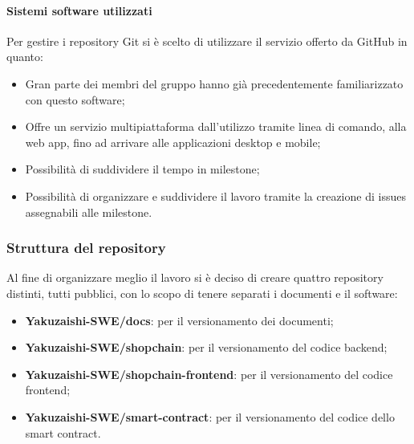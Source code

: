 \paragraph{Sistemi software utilizzati}
Per gestire i repository\glo{} Git\glo{} si è scelto di utilizzare il servizio offerto da GitHub\glo{} in quanto:
\begin{itemize}
    \item Gran parte dei membri del gruppo hanno già precedentemente familiarizzato con questo software;
    \item Offre un servizio multipiattaforma dall'utilizzo tramite linea di comando, alla web app, fino ad arrivare alle applicazioni desktop e mobile;
    \item Possibilità di suddividere il tempo in milestone\glo{};
    \item Possibilità di organizzare e suddividere il lavoro tramite la creazione di issues\glo{} assegnabili alle milestone\glo{}.
\end{itemize}


\subsubsection{Struttura del repository}\label{paragraph: repository}
Al fine di organizzare meglio il lavoro si è deciso di creare quattro repository\glo{} distinti, tutti pubblici, con lo scopo di tenere separati i documenti e il software:
\begin{itemize}
    \item \textbf{Yakuzaishi-SWE/docs}: per il versionamento dei documenti;
    \item \textbf{Yakuzaishi-SWE/shopchain}: per il versionamento del codice backend\glo{};
    \item \textbf{Yakuzaishi-SWE/shopchain-frontend}: per il versionamento del codice frontend\glo{};
    \item \textbf{Yakuzaishi-SWE/smart-contract}: per il versionamento del codice dello smart contract\glo{}.

\end{itemize}

